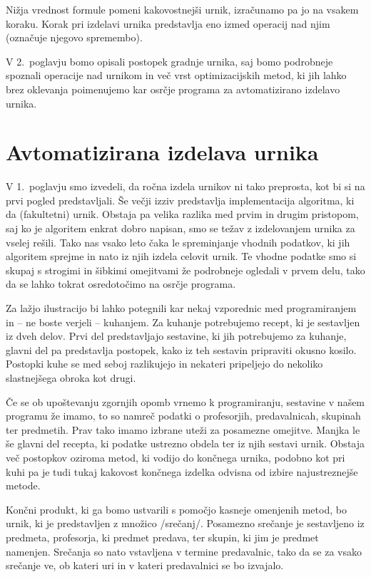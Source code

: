 \documentclass[a4paper, 10pt]{article}
\begin{document}
Nižja vrednost formule pomeni kakovostnejši urnik, izračunamo pa jo na vsakem koraku.
Korak pri izdelavi urnika predstavlja eno izmed operacij nad njim (označuje njegovo
spremembo).

V 2.\ poglavju bomo opisali postopek gradnje urnika, saj bomo podrobneje spoznali
operacije nad urnikom in več vrst optimizacijskih metod, ki jih lahko brez oklevanja
poimenujemo kar osrčje programa za avtomatizirano izdelavo urnika.

\section{Avtomatizirana izdelava urnika}

V 1.\ poglavju smo izvedeli, da ročna izdela urnikov ni tako preprosta, kot bi si
na prvi pogled predstavljali. Še večji izziv predstavlja implementacija algoritma, ki da
(fakultetni) urnik. Obstaja pa velika razlika med prvim in drugim pristopom, saj ko je
algoritem enkrat dobro napisan, smo se težav z izdelovanjem urnika za vselej rešili.
Tako nas vsako leto čaka le spreminjanje vhodnih podatkov, ki jih algoritem sprejme in
nato iz njih izdela celovit urnik. Te vhodne podatke smo si skupaj s strogimi in šibkimi
omejitvami že podrobneje ogledali v prvem delu, tako da se lahko tokrat osredotočimo na
osrčje programa.

Za lažjo ilustracijo bi lahko potegnili kar nekaj vzporednic med programiranjem in \--- ne
boste verjeli \--- kuhanjem. Za kuhanje potrebujemo recept, ki je sestavljen iz dveh delov.
Prvi del predstavljajo sestavine, ki jih potrebujemo za kuhanje, glavni del pa predstavlja
postopek, kako iz teh sestavin pripraviti okusno kosilo. Postopki kuhe se med seboj
razlikujejo in nekateri pripeljejo do nekoliko slastnejšega obroka kot drugi.

Če se ob upoštevanju zgornjih opomb vrnemo k programiranju, sestavine v našem programu že
imamo, to so namreč podatki o profesorjih, predavalnicah, skupinah ter predmetih. Prav tako
imamo izbrane uteži za posamezne omejitve. Manjka le še glavni del recepta, ki podatke
ustrezno obdela ter iz njih sestavi urnik. Obstaja več postopkov oziroma metod, ki vodijo
do končnega urnika, podobno kot pri kuhi pa je tudi tukaj kakovost končnega izdelka odvisna
od izbire najustreznejše metode.

Končni produkt, ki ga bomo ustvarili s pomočjo kasneje omenjenih metod, bo urnik, ki je
predstavljen z množico /srečanj/. Posamezno srečanje je sestavljeno iz predmeta,
profesorja, ki predmet predava, ter skupin, ki jim je predmet namenjen. Srečanja so nato
vstavljena v termine predavalnic, tako da se za vsako srečanje ve, ob kateri uri in v
kateri predavalnici se bo izvajalo.
\end{document}
